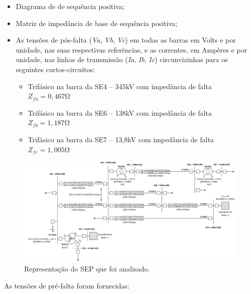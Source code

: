 \documentclass[a4paper, 12pt]{article}
\begin{document}
\begin{itemize}
    \itemsep0em 
    \item Diagrama de de sequência positiva;
    \item Matriz de impedância de base de sequência positiva;
    \item As tensões de pós-falta (\textit{Va}, \textit{Vb}, \textit{Vc}) em todas as barras em Volts e por unidade, nas suas respectivas referências, e as correntes, em Ampères e por unidade, nas linhas de transmissão (\textit{Ia}, \textit{Ib}, \textit{Ic}) circunvizinhas para os seguintes curtos-circuitos:
    \begin{itemize}
     \itemsep0em 
     \item Trifásico na barra da SE4 – 345kV com impedância de falta \\ $Z_f{_a} = 0,467 \si{\ohm}$
     \item Trifásico na barra da SE6 – 138kV com impedância de falta \\ $Z_f{_b} = 1,187 \si{\ohm}$
     \item Trifásico na barra da SE7 – 13,8kV com impedância de falta \\ $Z_f{_c} = 1,005 \si{\ohm}$
    \end{itemize}
\end{itemize}


\begin{figure}[h]
\centering
  \includegraphics[scale=0.5]{img/Esquematic-ckt-geral.png}
\caption{Representação do SEP que foi analisado.}
\label{fig:sep}
\end{figure}

As tensões de pré-falta foram fornecidas:\\
\end{document}
